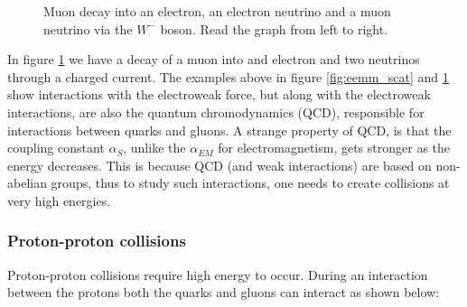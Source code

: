 \begin{figure}[H]
    \centering
    
    \caption[Muon decay diagram]{Muon decay into an electron, an electron neutrino and a muon neutrino via the $W^{-}$ boson. Read the graph from left to right.}
    \label{fig:mw_decay}
\end{figure}

In figure \ref{fig:mw_decay} we have a decay of a muon into and electron and two neutrinos through a charged current. 
 The examples above in figure \ref{fig:eemm_scat} and \ref{fig:mw_decay} show interactions with 
the electroweak force, but along with the electroweak interactions, are also the quantum chromodynamics (QCD), 
responsible for interactions between quarks and gluons. A strange property of QCD,
is that the coupling constant $\alpha_{S}$, unlike the $\alpha_{EM}$ for electromagnetism,
gets stronger as the energy decreases. This is because QCD (and weak interactions) are based on non-abelian 
groups\cite{Peskin:1995ev}, thus to study such interactions, one needs to create collisions at very high energies. 

\subsubsection*{Proton-proton collisions}
Proton-proton collisions require high energy to occur. During an interaction between the protons both the quarks and gluons
can interact as shown below:

